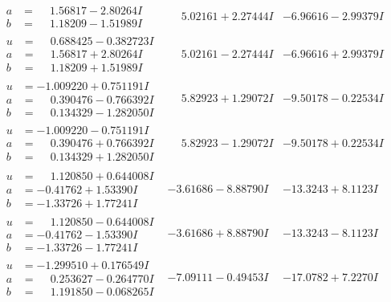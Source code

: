 \documentclass[1p]{elsarticle_modified}
\theoremstyle{definition}
\begin{document}
$$\begin{array}{c|c|c}
\begin{aligned}
a &= \phantom{-}1.56817 - 2.80264 I \\
b &= \phantom{-}1.18209 - 1.51989 I\end{aligned}
 & \phantom{-}5.02161 + 2.27444 I & -6.96616 - 2.99379 I \\ \hline\begin{aligned}
u &= \phantom{-}0.688425 - 0.382723 I \\
a &= \phantom{-}1.56817 + 2.80264 I \\
b &= \phantom{-}1.18209 + 1.51989 I\end{aligned}
 & \phantom{-}5.02161 - 2.27444 I & -6.96616 + 2.99379 I \\ \hline\begin{aligned}
u &= -1.009220 + 0.751191 I \\
a &= \phantom{-}0.390476 - 0.766392 I \\
b &= \phantom{-}0.134329 - 1.282050 I\end{aligned}
 & \phantom{-}5.82923 + 1.29072 I & -9.50178 - 0.22534 I \\ \hline\begin{aligned}
u &= -1.009220 - 0.751191 I \\
a &= \phantom{-}0.390476 + 0.766392 I \\
b &= \phantom{-}0.134329 + 1.282050 I\end{aligned}
 & \phantom{-}5.82923 - 1.29072 I & -9.50178 + 0.22534 I \\ \hline\begin{aligned}
u &= \phantom{-}1.120850 + 0.644008 I \\
a &= -0.41762 + 1.53390 I \\
b &= -1.33726 + 1.77241 I\end{aligned}
 & -3.61686 - 8.88790 I & -13.3243 + 8.1123 I \\ \hline\begin{aligned}
u &= \phantom{-}1.120850 - 0.644008 I \\
a &= -0.41762 - 1.53390 I \\
b &= -1.33726 - 1.77241 I\end{aligned}
 & -3.61686 + 8.88790 I & -13.3243 - 8.1123 I \\ \hline\begin{aligned}
u &= -1.299510 + 0.176549 I \\
a &= \phantom{-}0.253627 - 0.264770 I \\
b &= \phantom{-}1.191850 - 0.068265 I\end{aligned}
 & -7.09111 - 0.49453 I & -17.0782 + 7.2270 I \\ \hline\begin{aligned}

\end{aligned}
\end{array}$$
\end{document}
